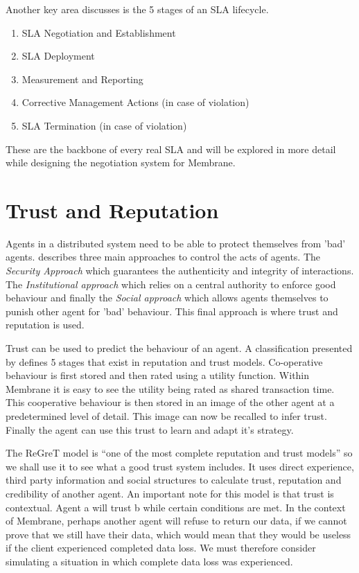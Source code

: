 \documentclass[a4paper, 11pt, twocolumn, twoside]{report}
\begin{document}
Another key area \cite{keller2002defining} discusses is the 5 stages of an SLA lifecycle.
\begin{enumerate}
 \item SLA Negotiation and Establishment
 \item SLA Deployment
 \item Measurement and Reporting
 \item Corrective Management Actions (in case of violation)
 \item SLA Termination (in case of violation)
\end{enumerate}
These are the backbone of every real SLA and will be explored in more detail while designing the negotiation system for Membrane.

\section{Trust and Reputation}

Agents in a distributed system need to be able to protect themselves from 'bad' agents. \cite{pinyol2013computational} describes three main approaches to control the acts of agents. The \emph{Security Approach} which guarantees the authenticity and integrity of interactions. The \emph{Institutional approach} which relies on a central authority to enforce good behaviour and finally the \emph{Social approach} which allows agents themselves to punish other agent for 'bad' behaviour. This final approach is where trust and reputation is used.

Trust can be used to predict the behaviour of an agent. \citep{wooldridge2009introduction} A classification presented by \cite{balke2009using} defines 5 stages that exist in reputation and trust models. Co-operative behaviour is first stored and then rated using a utility function. Within Membrane it is easy to see the utility being rated as shared transaction time. This cooperative behaviour is then stored in an image of the other agent at a predetermined level of detail. This image can now be recalled to infer trust. Finally the agent can use this trust to learn and adapt it's strategy.

The ReGreT model \citep{sabater2001regret} is ``one of the most complete reputation and trust models'' \citep{pinyol2013computational} so we shall use it to see what a good trust system includes. It uses direct experience, third party information and social structures to calculate trust, reputation and credibility of another agent. An important note for this model is that trust is contextual. Agent a will trust b while certain conditions are met. In the context of Membrane, perhaps another agent will refuse to return our data, if we cannot prove that we still have their data, which would mean that they would be useless if the client experienced completed data loss. We must therefore consider simulating a situation in which complete data loss was experienced.
\end{document}
